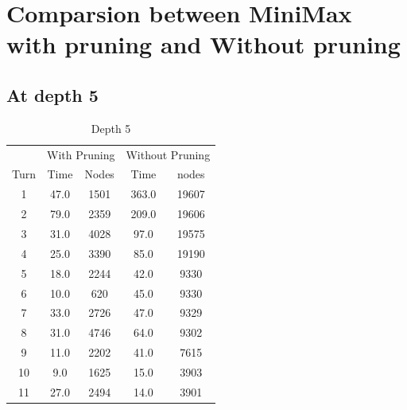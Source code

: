 \documentclass{article}
\begin{document}
\section{Comparsion between MiniMax with pruning and Without pruning}
\subsection{At depth 5}

\begin{table}[H]
    \caption{Depth 5}
    \centering
    \begin{tabular}{c c c c c}
        \toprule
                & \multicolumn{2}{c}{With Pruning} & \multicolumn{2}{c}{Without Pruning}                  \\
        \cmidrule{2-3}
        \cmidrule{4-5}
        Turn    & Time                             & Nodes                               & Time  & nodes  \\
        \midrule
        1       & 47.0                             & 1501                                & 363.0 & 19607  \\
        2       & 79.0                             & 2359                                & 209.0 & 19606  \\
        3       & 31.0                             & 4028                                & 97.0  & 19575  \\
        4       & 25.0                             & 3390                                & 85.0  & 19190  \\
        5       & 18.0                             & 2244                                & 42.0  & 9330   \\
        6       & 10.0                             & 620                                 & 45.0  & 9330   \\
        7       & 33.0                             & 2726                                & 47.0  & 9329   \\
        8       & 31.0                             & 4746                                & 64.0  & 9302   \\
        9       & 11.0                             & 2202                                & 41.0  & 7615   \\
        10      & 9.0                              & 1625                                & 15.0  & 3903   \\
        11      & 27.0                             & 2494                                & 14.0  & 3901   \\

\end{tabular}
\end{table}
\end{document}
